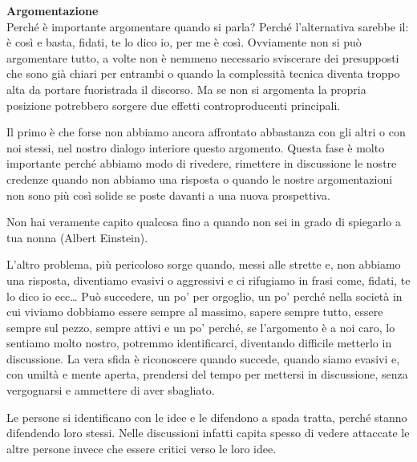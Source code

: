 \documentclass[12pt]{book} %
\begin{document}
\noindent \textbf{\large Argomentazione} \\
Perché è importante argomentare quando si parla? Perché l'alternativa sarebbe il: è così e
basta, fidati, te lo dico io, per me è così. Ovviamente non si può argomentare tutto, a volte non è nemmeno necessario
sviscerare dei presupposti che sono già chiari per entrambi o quando la complessità tecnica diventa troppo alta da
portare fuoristrada il discorso. Ma se non si argomenta la propria posizione potrebbero sorgere due effetti
controproducenti principali.

Il primo è che forse non abbiamo ancora affrontato abbastanza con gli altri o con noi stessi, nel nostro dialogo
interiore questo argomento. Questa fase è molto importante perché abbiamo modo di rivedere, rimettere in discussione le
nostre credenze quando non abbiamo una risposta o quando le nostre argomentazioni non sono più così solide se poste
davanti a una nuova prospettiva. 

Non hai veramente capito qualcosa fino a quando non sei in grado di spiegarlo a tua nonna (Albert Einstein).

L'altro problema, più pericoloso sorge quando, messi alle strette e, non abbiamo una risposta,
diventiamo evasivi o aggressivi e ci rifugiamo in frasi come, fidati, te lo dico io ecc… Può succedere, un po' per orgoglio, un po'
perché nella società in cui viviamo dobbiamo essere sempre al massimo, sapere sempre tutto, essere sempre sul pezzo,
sempre attivi e un po' perché, se l'argomento è a noi caro, lo sentiamo molto nostro, potremmo
identificarci, diventando difficile metterlo in discussione. La vera sfida è riconoscere quando succede, quando siamo
evasivi e, con umiltà e mente aperta, prendersi del tempo per mettersi in discussione, senza vergognarsi e ammettere di
aver sbagliato. 

Le persone si identificano con le idee e le difendono a spada tratta, perché stanno difendendo loro stessi. Nelle discussioni infatti capita spesso di vedere attaccate le altre persone invece che essere critici verso le loro idee.
\end{document}
